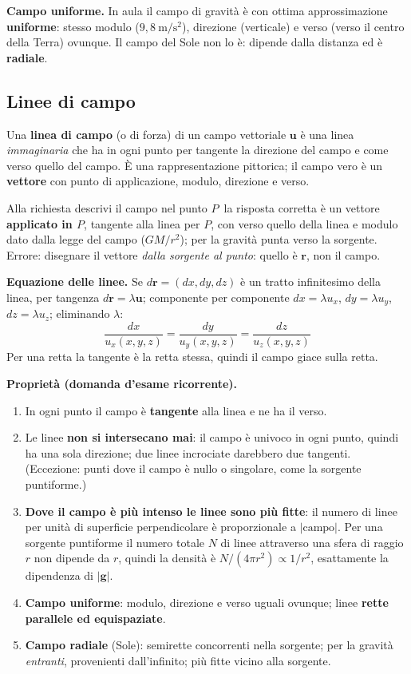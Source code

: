 \documentclass[11pt,a4paper]{article}
\newcommand{\vv}[1]{\mathbf{#1}}
\newcommand{\mo}[1]{\left|#1\right|}
\newcommand{\unit}[1]{\ \mathrm{#1}}
\begin{document}
\textbf{Campo uniforme.} In aula il campo di gravità è con ottima approssimazione \textbf{uniforme}: stesso modulo ($9{,}8\unit{m/s^2}$), direzione (verticale) e verso (verso il centro della Terra) ovunque. Il campo del Sole non lo è: dipende dalla distanza ed è \textbf{radiale}.

\subsection{Linee di campo}
Una \textbf{linea di campo} (o di forza) di un campo vettoriale $\vv u$ è una linea \emph{immaginaria} che ha in ogni punto per tangente la direzione del campo e come verso quello del campo. È una rappresentazione pittorica; il campo vero è un \textbf{vettore} con punto di applicazione, modulo, direzione e verso.

\begin{esame}
Alla richiesta \guillemotleft descrivi il campo nel punto $P$\guillemotright\ la risposta corretta è un vettore \textbf{applicato in $P$}, tangente alla linea per $P$, con verso quello della linea e modulo dato dalla legge del campo ($GM/r^2$); per la gravità punta verso la sorgente. Errore: disegnare il vettore \emph{dalla sorgente al punto}: quello è $\vv r$, non il campo.
\end{esame}

\textbf{Equazione delle linee.} Se $d\vv r=(dx,dy,dz)$ è un tratto infinitesimo della linea, per tangenza $d\vv r=\lambda\vv u$; componente per componente $dx=\lambda u_x$, $dy=\lambda u_y$, $dz=\lambda u_z$; eliminando $\lambda$:
\begin{equation}
\frac{dx}{u_x(x,y,z)}=\frac{dy}{u_y(x,y,z)}=\frac{dz}{u_z(x,y,z)}
\end{equation}
Per una retta la tangente è la retta stessa, quindi il campo giace sulla retta.

\textbf{Proprietà (domanda d'esame ricorrente).}
\begin{enumerate}[nosep]
\item In ogni punto il campo è \textbf{tangente} alla linea e ne ha il verso.
\item Le linee \textbf{non si intersecano mai}: il campo è univoco in ogni punto, quindi ha una sola direzione; due linee incrociate darebbero due tangenti. (Eccezione: punti dove il campo è nullo o singolare, come la sorgente puntiforme.)
\item \textbf{Dove il campo è più intenso le linee sono più fitte}: il numero di linee per unità di superficie perpendicolare è proporzionale a $\mo{\text{campo}}$. Per una sorgente puntiforme il numero totale $N$ di linee attraverso una sfera di raggio $r$ non dipende da $r$, quindi la densità è $N/(4\pi r^2)\propto1/r^2$, esattamente la dipendenza di $\mo{\vv g}$.
\item \textbf{Campo uniforme}: modulo, direzione e verso uguali ovunque; linee \textbf{rette parallele ed equispaziate}.
\item \textbf{Campo radiale} (Sole): semirette concorrenti nella sorgente; per la gravità \emph{entranti}, provenienti dall'infinito; più fitte vicino alla sorgente.
\end{enumerate}
\end{document}
